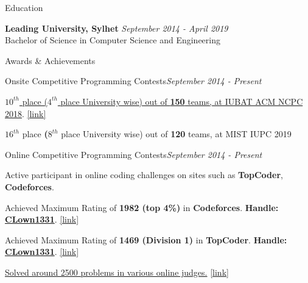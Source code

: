 \documentclass{resume}
\begin{document}

\begin{rSection}{Education}

{\bf Leading University, Sylhet} \hfill {\em September 2014 - April 2019}
\\ Bachelor of Science in Computer Science and Engineering
\end{rSection}



\begin{rSection}{Awards \& Achievements} 

\begin{rSubsection}{Onsite Competitive Programming Contests}{\em September 2014 - Present}{}{}{}
\item \href{https://icpc.baylor.edu/ICPCID/DII3NHEO8O8I}{\textbf{$10^{th}$} place (\textbf{$4^{th}$} place University wise) out of \textbf{150} teams, at IUBAT ACM NCPC 2018}. \href{https://icpc.baylor.edu/ICPCID/DII3NHEO8O8I}{[link]}
\item \textbf{$16^{th}$} place \textbf(\textbf{$8^{th}$} place University wise) out of \textbf{120} teams, at MIST IUPC 2019
\end{rSubsection}

\begin{rSubsection}{Online Competitive Programming Contests}{\em September 2014 - Present}{}{}{}
\item Active participant in online coding challenges on sites such as \textbf{TopCoder}, \textbf{Codeforces}.
\item Achieved Maximum Rating of \textbf{1982 (top 4\%)} in \textbf{Codeforces}. \textbf{Handle:} \textbf{\href{http://codeforces.com/profile/CLown1331}{CLown1331}}. \href{http://codeforces.com/profile/CLown1331}{[link]}
\item Achieved Maximum Rating of \textbf{1469 (Division 1)} in \textbf{TopCoder}. \textbf{Handle:} \textbf{\href{https://www.topcoder.com/members/CLown1331/}{CLown1331}}. \href{https://www.topcoder.com/members/CLown1331/}{[link]}
\item \href{https://www.stopstalk.com/user/profile/clown1331}{Solved around 2500 problems in various online judges.} \href{https://www.stopstalk.com/user/profile/clown1331}{[link]}
\end{rSubsection}

\end{rSection}
\end{document}
